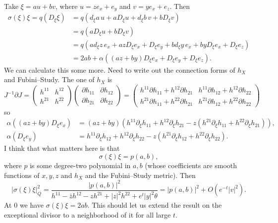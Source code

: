 \documentclass[10pt,a4paper]{amsart}
\begin{document}
Take $\xi = a u + bv$, where $u = ze_x + e_y$ and $v = ye_x + e_z$.
Then
\begin{align*}
\sigma(\xi)\xi =
q(D_\xi\xi)
&= q(d_\xi a \, u + a D_\xi u + d_\xi b \, v + b D_\xi v)
\\
&= q(a D_\xi u + b D_\xi v)
\\
&= q(a d_\xi z \, e_x + az D_\xi  e_x + D_\xi  e_y + b d_\xi y \, e_x + by D_\xi  e_x + D_\xi  e_z)
\\
&= 2ab
+ \alpha( (az + by) D_\xi e_x + D_\xi e_y + D_\xi e_z).
\end{align*}
We can calculate this some more.
Need to write out the connection forms of $h_X$ and Fubini--Study.
The one of $h_X$ is
$$
J^{-1} \partial J
=
\begin{pmatrix}
h^{11} & h^{12}
\\
h^{21} & h^{22}
\end{pmatrix}
\begin{pmatrix}
\partial h_{11} & \partial h_{12}
\\
\partial h_{21} & \partial h_{22}
\end{pmatrix}
=
\begin{pmatrix}
h^{11} \partial h_{11} {+} h^{12} \partial h_{21} &
h^{11} \partial h_{12} {+} h^{12} \partial h_{22}
\\
h^{21} \partial h_{11} {+} h^{22} \partial h_{21} &
h^{21} \partial h_{12} {+} h^{22} \partial h_{22}
\end{pmatrix}
$$
so
\begin{align*}
\alpha((az+by) D_\xi e_x)
&= (az + by) (
h^{11} \partial_\xi h_{11} {+} h^{12} \partial_\xi h_{21}
- z  (h^{21} \partial_\xi h_{11} {+} h^{22} \partial_\xi h_{21} )
),
\\
\alpha(D_\xi e_y)
&=
h^{11} \partial_\xi h_{12} {+} h^{12} \partial_\xi h_{22}
- z (h^{21} \partial_\xi h_{12} {+} h^{22} \partial_\xi h_{22}).
\end{align*}
I think that what matters here is that
$$
\sigma(\xi)\xi
= p(a,b),
$$
where $p$ is some degree-two polynomial in $a,b$ (whose coefficients are smooth
functions of $x,y,z$ and $h_X$ and the Fubini--Study metric).
Then
$$
|\sigma(\xi)\xi|^2_Q
= \frac{|p(a,b)|^2}{h^{11} - \bar z h^{12} - z h^{21} + |z|^2 h^{22} + e^t |y|^2 \theta}
= |p(a,b)|^2 + O(e^{-t} |v|^2).
$$
At $0$ we have $\sigma(\xi)\xi = 2ab$.
This should let us extend the result on the exceptional divisor to a
neighborhood of it for all large $t$.
\end{document}
